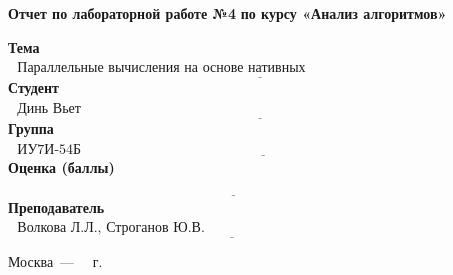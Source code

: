 \begin{titlepage}
	
	\begin{center}
		\Large\textbf{Отчет по лабораторной работе №4}
		\Large\textbf {по курсу «Анализ алгоритмов»}
	\end{center}
	
	\noindent\textbf{Тема} $\underline{\text{~~Параллельные вычисления на основе нативных потоков~~~~~~~~~~~~~~~~~~~~~~~~~~~~~~~~~~~}}$\newline\newline\newline
	\noindent\textbf{Студент} $\underline{\text{~~Динь Вьет Ань~~~~~~~~~~~~~~~~~~~~~~~~~~~~~~~~~~~~~~~~~~~~~~~~~~~~~~~~~~~~~~~~~~~~~~~~~~~~~~~~~~~~~~~}}$\newline\newline
	\noindent\textbf{Группа} $\underline{\text{~~ИУ7И-54Б~~~~~~~~~~~~~~~~~~~~~~~~~~~~~~~~~~~~~~~~~~~~~~~~~~~~~~~~~~~~~~~~~~~~~~~~~~~~~~~~~~~~~~~~~~~~~~}}$\newline\newline
	\noindent\textbf{Оценка (баллы)} $\underline{\text{~~~~~~~~~~~~~~~~~~~~~~~~~~~~~~~~~~~~~~~~~~~~~~~~~~~~~~~~~~~~~~~~~~~~~~~~~~~~~~~~~~~~~~~~~~~~~~~~~}}$\newline\newline
	\noindent\textbf{Преподаватель} $\underline{\text{~~Волкова Л.Л.,~Строганов Ю.В.~~~~~~~~~~~~~~~~~~~~~~~~~~~~~~~~~~~~~~~~~~~~~~~~~~~~~~}}$\newline
	
	\begin{center}
		\vfill
		Москва~---~\the\year
		~г.
	\end{center}
	\restoregeometry
\end{titlepage}

